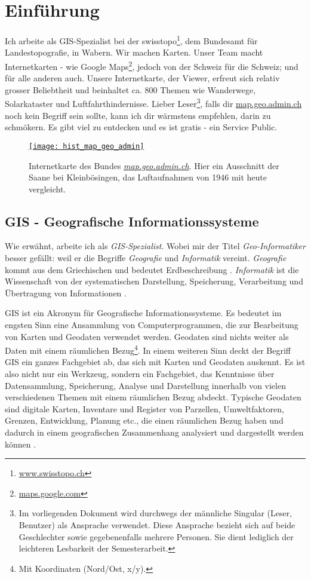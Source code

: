 \section{Einführung}
Ich arbeite als GIS-Spezialist bei der swisstopo\footnote{\href{https://www.swisstopo.ch}{www.swisstopo.ch}}, dem Bundesamt für Landestopografie, in Wabern. Wir machen Karten. Unser Team macht Internetkarten - wie Google Maps\footnote{\href{https://maps.google.com}{maps.google.com}}, jedoch von der Schweiz für die Schweiz; und für alle anderen auch. Unsere Internetkarte, der Viewer, erfreut sich relativ grosser Beliebtheit
und beinhaltet ca. 800 Themen wie Wanderwege, Solarkataster und Luftfahrthindernisse. Lieber Leser\footnote{Im vorliegenden Dokument wird durchwegs der männliche Singular (Leser, Benutzer) als Ansprache verwendet. Diese Ansprache bezieht sich auf beide Geschlechter sowie gegebenenfalls mehrere Personen. Sie dient lediglich der leichteren Lesbarkeit der Semesterarbeit.}, falls dir \href{https://map.geo.admin.ch}{map.geo.admin.ch} noch kein Begriff sein sollte, kann ich dir wärmstens empfehlen, darin zu schmökern. Es gibt viel zu entdecken und es ist gratis - ein Service Public.

\begin{figure}[H]
	\centering
	\href{https://s.geo.admin.ch/8a82499889}{
	\texttt{[image: hist\_map\_geo\_admin]}}
	\caption{Internetkarte des Bundes \emph{\href{https://s.geo.admin.ch/8a82499889}{map.geo.admin.ch}}. Hier ein Ausschnitt der Saane bei Kleinbösingen, das Luftaufnahmen von 1946 mit heute vergleicht.}
	\label{fig:map.geo.admin.ch}
\end{figure}


\subsection{GIS - Geografische Informationssysteme}
Wie erwähnt, arbeite ich als \emph{GIS-Spezialist}. Wobei mir der Titel \emph{Geo-Informatiker} besser gefällt: weil er die Begriffe \emph{Geografie} und \emph{Informatik} vereint. \emph{Geografie} kommt aus dem Griechischen und bedeutet Erdbeschreibung \autocite[14]{Schertenleib2004}. \emph{Informatik} ist die Wissenschaft von der systematischen Darstellung, Speicherung, Verarbeitung und Übertragung von Informationen \cite{Informatik2010}.

GIS ist ein Akronym für Geografische Informationssysteme. Es bedeutet im engsten Sinn eine Ansammlung von Computerprogrammen, die zur Bearbeitung von Karten und Geodaten verwendet werden. Geodaten sind nichts weiter als Daten mit einem räumlichen Bezug\footnote{Mit Koordinaten (Nord/Ost, x/y).}. In einem weiteren Sinn deckt der Begriff GIS ein ganzes Fachgebiet ab, das sich mit Karten und Geodaten auskennt. Es ist also nicht nur ein Werkzeug, sondern ein Fachgebiet, das Kenntnisse über Datensammlung, Speicherung, Analyse und Darstellung innerhalb von vielen verschiedenen Themen mit einem räumlichen Bezug abdeckt. Typische Geodaten sind digitale Karten, Inventare und Register von Parzellen, Umweltfaktoren, Grenzen, Entwicklung, Planung etc., die einen räumlichen Bezug haben und dadurch in einem geografischen Zusammenhang analysiert und dargestellt werden können \autocite[15]{Balstroem}.

